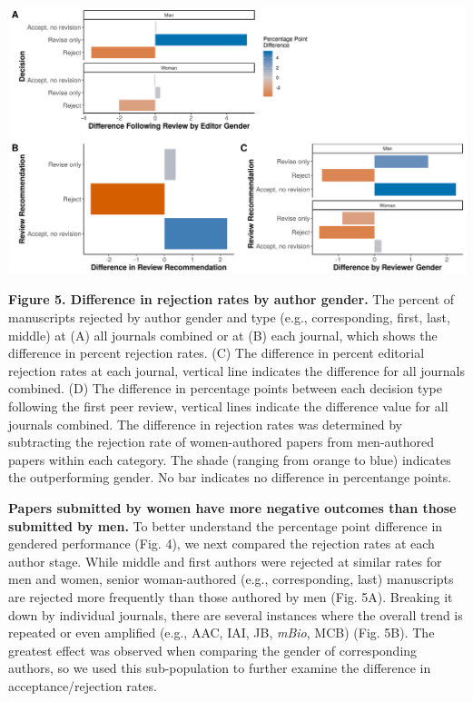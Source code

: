 \documentclass[11pt,]{article}
\begin{document}
\includegraphics{Figure_6.png}

\textbf{Figure 5. Difference in rejection rates by author gender.} The
percent of manuscripts rejected by author gender and type (e.g.,
corresponding, first, last, middle) at (A) all journals combined or at
(B) each journal, which shows the difference in percent rejection rates.
(C) The difference in percent editorial rejection rates at each journal,
vertical line indicates the difference for all journals combined. (D)
The difference in percentage points between each decision type following
the first peer review, vertical lines indicate the difference value for
all journals combined. The difference in rejection rates was determined
by subtracting the rejection rate of women-authored papers from
men-authored papers within each category. The shade (ranging from orange
to blue) indicates the outperforming gender. No bar indicates no
difference in percentange points.

\textbf{Papers submitted by women have more negative outcomes than those
submitted by men.} To better understand the percentage point difference
in gendered performance (Fig. 4), we next compared the rejection rates
at each author stage. While middle and first authors were rejected at
similar rates for men and women, senior woman-authored (e.g.,
corresponding, last) manuscripts are rejected more frequently than those
authored by men (Fig. 5A). Breaking it down by individual journals,
there are several instances where the overall trend is repeated or even
amplified (e.g., AAC, IAI, JB, \emph{mBio}, MCB) (Fig. 5B). The greatest
effect was observed when comparing the gender of corresponding authors,
so we used this sub-population to further examine the difference in
acceptance/rejection rates.
\end{document}
